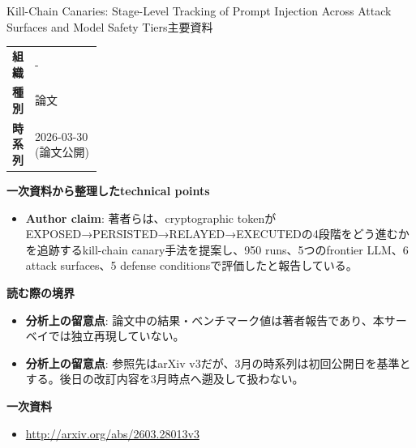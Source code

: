 \begin{technicalnote}{Kill-Chain Canaries: Stage-Level Tracking of Prompt Injection Across Attack Surfaces and Model Safety Tiers}{主要資料}
\begingroup
\begin{tabularx}{\linewidth}{@{}>{\bfseries}p{0.22\linewidth}X@{}}
組織 & - \\
種別 & 論文 \\
時系列 & 2026-03-30 (論文公開) \\
\end{tabularx}
\smallskip
{\bfseries 一次資料から整理したtechnical points}
\begin{itemize}[leftmargin=1.5em,itemsep=0.35em]
\item \textbf{Author claim}: 著者らは、cryptographic tokenがEXPOSED→PERSISTED→RELAYED→EXECUTEDの4段階をどう進むかを追跡するkill-chain canary手法を提案し、950 runs、5つのfrontier LLM、6 attack surfaces、5 defense conditionsで評価したと報告している。
\end{itemize}
\begin{minipage}{\linewidth}
{\bfseries 読む際の境界}
\begin{itemize}[leftmargin=1.5em,itemsep=0.35em]
\item \textbf{分析上の留意点}: 論文中の結果・ベンチマーク値は著者報告であり、本サーベイでは独立再現していない。
\item \textbf{分析上の留意点}: 参照先はarXiv v3だが、3月の時系列は初回公開日を基準とする。後日の改訂内容を3月時点へ遡及して扱わない。
\end{itemize}
\begin{samepage}
{\bfseries 一次資料}
\begingroup\sloppy
\begin{itemize}[leftmargin=1.5em,itemsep=0.25em]
\item {\scriptsize\url{http://arxiv.org/abs/2603.28013v3}}
\end{itemize}
\endgroup
\end{samepage}
\end{minipage}
\endgroup
\end{technicalnote}
\medskip

